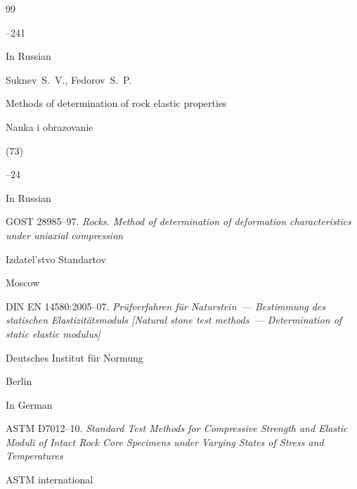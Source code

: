 \begin{thebibliography}{99}


–241







\lang In Russian

\by Suknev~S.~V., Fedorov~S.~P.

\paper Methods of determination of rock elastic properties

\jour Nauka i obrazovanie


(73)

--24










\lang In Russian

\thesis \rm GOST 28985--97. \it Rocks. Method of determination of deformation characteristics under uniaxial compression 

\publ Izdatel'stvo Standartov

\publaddr Moscow








\thesis \rm DIN EN 14580:2005--07. \it  Pr\"ufverfahren f\"ur Naturstein~--- Bestimmung des statischen Elastizit\"atsmoduls \rm [Natural stone test methods~--- Determination of static elastic modulus]

\publ Deutsches Institut f\"ur Normung

\publaddr Berlin



\lang In German




\thesis \rm ASTM D7012--10. \it  Standard Test Methods for Compressive Strength and Elastic Moduli of Intact Rock Core Specimens under Varying States of Stress and Temperatures

\publ ASTM international


\end{thebibliography}
